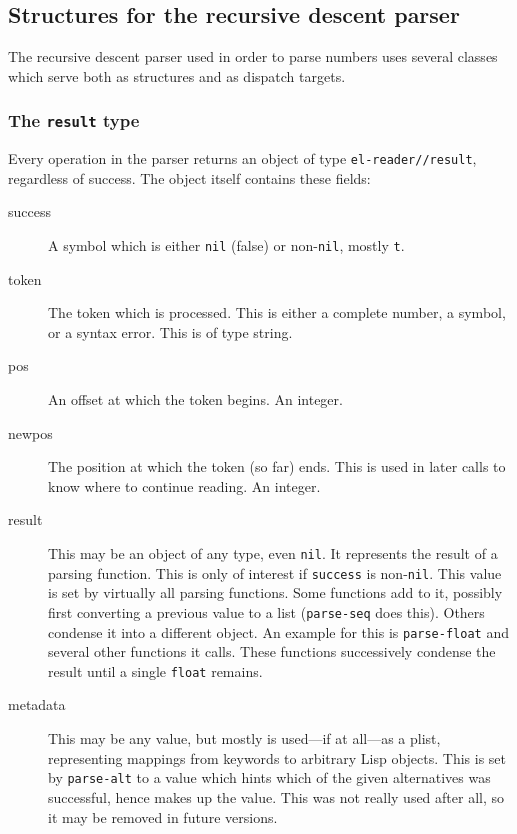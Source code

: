 \documentclass[a4paper,10pt,twoside]{report}
\newcommand{\sym}[1]{\texttt{#1}}
\newcommand{\fun}[1]{\texttt{#1}}
\newcommand{\nil}{\sym{nil}}
\newcommand{\tee}{\sym{t}}
\begin{document}
\subsection{Structures for the recursive descent parser}
\label{subsec:parser-structs}

The recursive descent parser used in order to parse numbers uses several classes
which serve both as structures and as dispatch targets.

\subsubsection{The \sym{result} type}
\label{subsubsec:result}

Every operation in the parser returns an object of type \fun{el-reader//result},
regardless of success.  The object itself contains these fields:

\begin{description}
\item[success] A symbol which is either \nil{} (false) or non-\nil{}, mostly
  \tee{}.
\item[token] The token which is processed.  This is either a complete number, a
  symbol, or a syntax error.  This is of type string.
\item[pos] An offset at which the token begins.  An integer.
\item[newpos] The position at which the token (so far) ends.  This is used in
  later calls to know where to continue reading.  An integer.
\item[result] This may be an object of any type, even \nil{}.  It represents the
  result of a parsing function.  This is only of interest if \sym{success} is
  non-\nil{}.  This value is set by virtually all parsing functions.  Some
  functions add to it, possibly first converting a previous value to a list
  (\fun{parse-seq} does this).  Others condense it into a different object.  An
  example for this is \fun{parse-float} and several other functions it calls.
  These functions successively condense the result until a single \sym{float}
  remains.
\item[metadata] This may be any value, but mostly is used---if at all---as a
  plist, representing mappings from keywords to arbitrary Lisp objects.  This is
  set by \fun{parse-alt} to a value which hints which of the given alternatives
  was successful, hence makes up the value.  This was not really used after
  all, so it may be removed in future versions.
\end{description}
\end{document}
